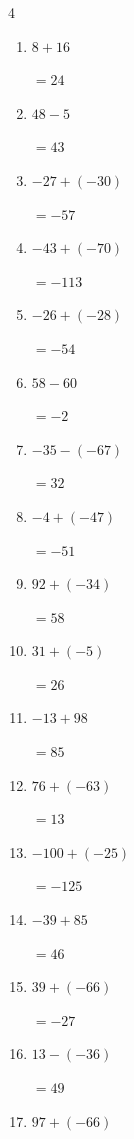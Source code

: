 \begin{multicols}{4}
\begin{enumerate}
        $=101$

  \item $8+16$

        $=24$

  \item $48-5$

        $=43$

  \item $-27+(-30)$

        $=-57$

  \item $-43+(-70)$

        $=-113$

  \item $-26+(-28)$

        $=-54$

  \item $58-60$

        $=-2$

  \item $-35-(-67)$

        $=32$

\columnbreak %

  \item $-4+(-47)$

        $=-51$

  \item $92+(-34)$

        $=58$

  \item $31+(-5)$

        $=26$

  \item $-13+98$

        $=85$

  \item $76+(-63)$

        $=13$

  \item $-100+(-25)$

        $=-125$

  \item $-39+85$

        $=46$

  \item $39+(-66)$

        $=-27$

  \item $13-(-36)$

        $=49$

  \item $97+(-66)$


\end{enumerate}
\end{multicols}
